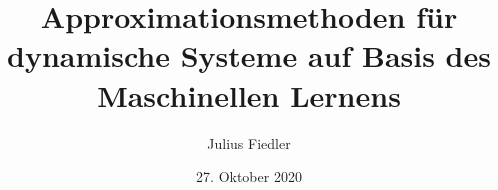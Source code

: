 \documentclass[arbeit=studie,oneside,BCOR=12mm]{ArbeitRST}
\begin{document}

\author{Julius Fiedler}



\title{Approximationsmethoden für dynamische Systeme auf Basis des Maschinellen Lernens}




\date{27. Oktober 2020}


\pagestyle{plain}


\maketitle





\selbststaendigkeitserklaerung


\kurzfassung{}{}


\tableofcontents





\listoffigures





\end{document}

